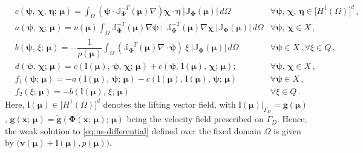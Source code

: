 \documentclass{elsarticle}
\theoremstyle{theorem}
\theoremstyle{definition}
\theoremstyle{remark}
\theoremstyle{proposition}
\numberwithin{figure}{section}
\newcommand{\wt}[1]{\widetilde{#1}}
\newcommand{\bg}[1]{\boldsymbol{#1}}
\begin{document}
		\begin{subequations}
			\label{eq:ns-weak-forms}
			\begin{align}
				\label{eq:ns-weak-forms-c-reference}
				& c(\bg{\psi}, \, \bg{\chi}, \, \bg{\eta}; \, \bg{\mu}) = \int_{\Omega} \left( \bg{\psi} \cdot \mathbb{J}^{-T}_{\bg{\Phi}}(\bg{\mu}) \nabla \right) \bg{\chi} \cdot \bg{\eta} ~ \lvert \mathbb{J}_{\bg{\Phi}}(\bg{\mu}) \rvert \, d \Omega & \forall \bg{\psi}, \, \bg{\chi}, \, \bg{\eta} \in \big[ H^1(\Omega) \big]^d \, , \\[0.1cm]
				\label{eq:ns-weak-forms-a-reference}
				& a(\bg{\psi}, \, \bg{\chi}; \, \bg{\mu}) = \nu(\bg{\mu}) \int_{\Omega} \mathbb{J}^{-T}_{\bg{\Phi}}(\bg{\mu}) \nabla \bg{\psi} ~ : ~ \mathbb{J}^{-T}_{\bg{\Phi}}(\bg{\mu}) \nabla \bg{\chi} ~ \lvert \mathbb{J}_{\bg{\Phi}}(\bg{\mu}) \rvert \, d \Omega & \forall \bg{\psi}, \, \bg{\chi} \in X \, , \\[0.1cm]
				\label{eq:ns-weak-forms-b-reference}
				& b(\bg{\psi}, \, \xi; \, \bg{\mu}) = - \dfrac{1}{\rho(\bg{\mu})} \int_{\Omega} \left( \mathbb{J}^{-T}_{\bg{\Phi}}(\bg{\mu}) \nabla \cdot \bg{\psi} \right) ~ \xi ~ \lvert \mathbb{J}_{\bg{\Phi}}(\bg{\mu}) \rvert \, d \Omega & \forall \bg{\psi} \in X \, , \forall \xi \in Q \, , \\[0.1cm]
				\label{eq:ns-weak-forms-d-reference}
				& d(\bg{\psi}, \, \bg{\chi}; \, \bg{\mu}) = c(\bg{l}(\bg{\mu}), \, \bg{\psi}, \, \bg{\chi}; \, \bg{\mu}) + c(\bg{\psi}, \, \bg{l}(\bg{\mu}), \, \bg{\chi}; \, \bg{\mu}); & \forall \bg{\psi}, \, \bg{\chi} \in X \, , \\[0.1cm]
				\label{eq:ns-weak-forms-f1-reference}
				& f_1(\bg{\psi}; \, \bg{\mu}) = - a(\bg{l}(\bg{\mu}), \, \bg{\psi}; \, \bg{\mu}) - c(\bg{l}(\bg{\mu}), \, \bg{l}(\bg{\mu}), \, \bg{\psi}; \, \bg{\mu}) & \forall \bg{\psi} \in X \, , \\[0.2cm]
				\label{eq:ns-weak-forms-f2-reference}
				& f_2(\xi; \, \bg{\mu}) = - b(\bg{l}(\bg{\mu}), \, \xi; \, \bg{\mu}) & \forall \xi \in Q \, .
			\end{align}
		\end{subequations}
		Here, $\bg{l}(\bg{\mu}) \in \big[ H^1(\Omega) \big]^d$ denotes the lifting vector field, with $\bg{l}(\bg{\mu}) \big\rvert_{\Gamma_D} = \bg{g}(\bg{\mu})$, $\bg{g}(\bg{x}; \, \bg{\mu}) = \wt{\bg{g}}(\bg{\Phi}(\bg{x}; \, \bg{\mu}); \, \bg{\mu})$ being the velocity field prescribed on $\Gamma_D$. Hence, the weak solution to \eqref{eq:ns-differential} defined over the fixed domain $\Omega$ is given by $\big( \bg{v}(\bg{\mu}) + \bg{l}(\bg{\mu}), p(\bg{\mu}) \big)$.
		
\end{document}
